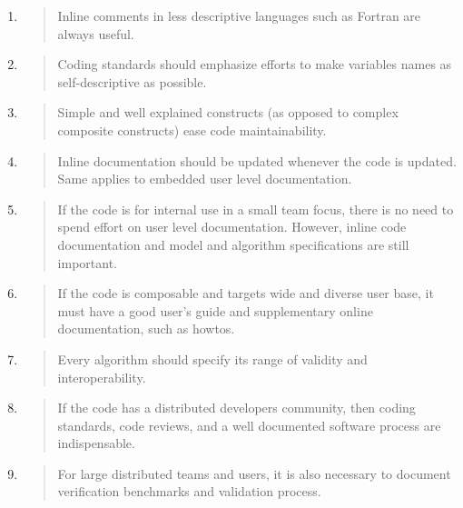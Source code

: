 \documentclass[]{article}
\begin{document}
\begin{enumerate}
\def\labelenumi{(\arabic{enumi})}
\item
  \begin{quote}
  Inline comments in less descriptive languages such as Fortran are
  always useful.
  \end{quote}
\item
  \begin{quote}
  Coding standards should emphasize efforts to make variables names as
  self-descriptive as possible.
  \end{quote}
\item
  \begin{quote}
  Simple and well explained constructs (as opposed to complex composite
  constructs) ease code maintainability.
  \end{quote}
\item
  \begin{quote}
  Inline documentation should be updated whenever the code is updated.
  Same applies to embedded user level documentation.
  \end{quote}
\item
  \begin{quote}
  If the code is for internal use in a small team focus, there is no
  need to spend effort on user level documentation. However, inline code
  documentation and model and algorithm specifications are still
  important.
  \end{quote}
\item
  \begin{quote}
  If the code is composable and targets wide and diverse user base, it
  must have a good user's guide and supplementary online documentation,
  such as howtos.
  \end{quote}
\item
  \begin{quote}
  Every algorithm should specify its range of validity and
  interoperability.
  \end{quote}
\item
  \begin{quote}
  If the code has a distributed developers community, then coding
  standards, code reviews, and a well documented software process are
  indispensable.
  \end{quote}
\item
  \begin{quote}
  For large distributed teams and users, it is also necessary to
  document verification benchmarks and validation process.
  \end{quote}
\end{enumerate}
\end{document}
